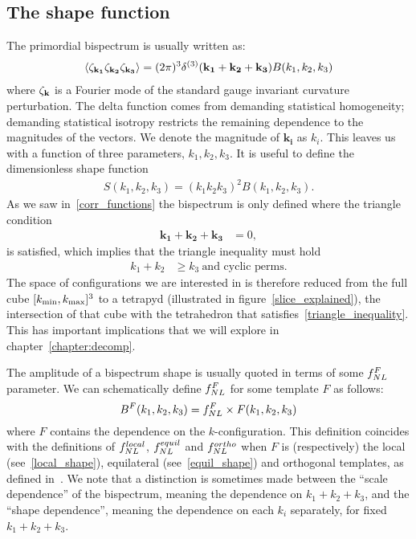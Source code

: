     \subsection{The shape function}
The primordial bispectrum is usually written as:
\begin{align}\label{bispectrum_definition}
{
\left< \zeta_{\bf{k_1}}\zeta_{\bf{k_2}}\zeta_{\bf{k_3}} \right>
= (2\pi)^3\delta^{(3)}(\mathbf{k_1}+\mathbf{k_2}+\mathbf{k_3})B(k_1,k_2,k_3)
}
\end{align}
where $\zeta_{\bf{k}}$ is a Fourier mode of the standard gauge invariant curvature perturbation.
The delta function comes from demanding statistical homogeneity;
demanding statistical isotropy restricts the remaining dependence to the magnitudes of the vectors.
We denote the magnitude of $\mathbf{k_i}$ as $k_i$.
This leaves us with a function of three parameters,
$k_1,k_2,k_3$.
It is useful to define the dimensionless shape function
\begin{align}\label{shapefn}
    S(k_1,k_2,k_3) = (k_1k_2k_3)^2B(k_1,k_2,k_3).
\end{align}
As we saw in~\ref{corr_functions}
the bispectrum is only defined where the triangle condition
\begin{align}\label{triangle_condition}
    \mathbf{k_1}+\mathbf{k_2}+\mathbf{k_3} &= 0,
\end{align}
is satisfied, which implies that the triangle inequality must hold
\begin{align}\label{triangle_inequality}
    k_1+k_2 &\geq k_3~\text{and cyclic perms}.
\end{align}
The space of configurations we are interested in is therefore
reduced from the full cube $[{k_\text{min}},{k_\text{max}}]^3$
to a tetrapyd (illustrated in figure~\ref{slice_explained}),
the intersection of that cube with the
tetrahedron that satisfies~\eqref{triangle_inequality}.
This has important implications that we will explore in
chapter~\ref{chapter:decomp}. 


The amplitude of a bispectrum shape is usually
quoted in terms of some $f_{NL}^F$ parameter.
We can schematically define $f_{NL}^F$ for some template $F$ as follows:
\begin{equation}\label{def:fnl}
{
B^{F}(k_1,k_2,k_3) = f_{NL}^{F}\times F(k_1,k_2,k_3)
}
\end{equation}
where $F$ contains the dependence on the $k$-configuration.
This definition coincides with the definitions of
$f^{local}_{NL}$, $f^{equil}_{NL}$ and $f^{ortho}_{NL}$
when $F$ is (respectively) the local (see~\eqref{local_shape}),
equilateral (see~\eqref{equil_shape}) and orthogonal templates,
as defined in~\cite{Planck_NG_2013, Planck_NG_2015}.
We note that a distinction is sometimes made between the ``scale dependence''
of the bispectrum, meaning the dependence on $k_1+k_2+k_3$, and the ``shape dependence'',
meaning the dependence on each $k_i$ separately, for fixed $k_1+k_2+k_3$.

